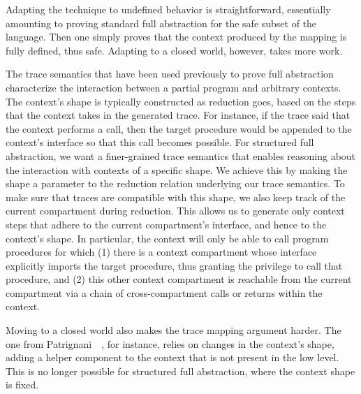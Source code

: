 \documentclass[10pt, conference, compsocconf, letterpaper, times]{IEEEtran}
\begin{document}
Adapting the technique to undefined behavior is straightforward, 
essentially amounting to proving standard full abstraction for the safe
subset of the language.
Then one simply proves that the context produced by the
mapping is fully defined, thus safe.
Adapting to a closed world, however, takes more work.

The trace semantics that have been used previously to prove full abstraction
characterize the interaction between a partial program and arbitrary
contexts.
The context's shape is typically constructed as reduction goes,
based on the steps that the context takes in the generated trace.
For instance, if the trace said that the context performs a call, then
the target procedure would be appended to the context's interface so
that this call becomes possible.
For structured full abstraction, we want a finer-grained trace
semantics that enables reasoning about the interaction with
contexts of a specific shape.
We achieve this by making the shape a parameter to the reduction
relation underlying our trace semantics.
To make sure that traces are compatible with this shape, we also
keep track of the current compartment during reduction.
This allows us to generate only context steps that adhere to the
current compartment's interface, and hence to the context's shape.
In particular, the context will only be able to call program
procedures for which
(1) there is a context compartment whose interface explicitly imports
the target procedure, thus granting the privilege to call that
procedure,
and (2) this other context compartment is reachable from the current
compartment via a chain of cross-compartment calls or returns within
the context.

Moving to a closed world also makes the trace mapping argument harder.
The one from Patrignani~\ETAL~\cite{PatrignaniASJCP15},
for instance, relies on changes in the context's shape,
\EG adding a helper component to the context that is not present in
the low level.
This is no longer possible for structured full abstraction,
where the context shape is fixed.

\ifsooner
{}
\fi

\label{sec:trace-semantics}
\end{document}
